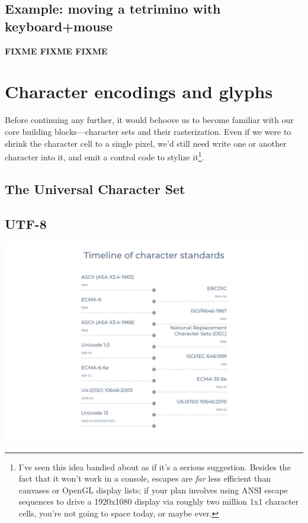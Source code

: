\documentclass[letterpaper,10pt]{article}
\begin{document}
\subsection{Example: moving a tetrimino with keyboard+mouse}
\textbf{FIXME FIXME FIXME}

\newpage


\section{Character encodings and glyphs}
\label{section:unicode}
Before continuing any further, it would behoove us to become familiar with our
core building blocks---character sets and their rasterization. Even if we were
to shrink the character cell to a single pixel, we'd still need write one or
another character into it, and emit a control code to stylize it\footnote{I've
seen this idea bandied about as if it's a serious suggestion. Besides the fact
that it won't work in a console, escapes are \textit{far} less efficient than
canvases or OpenGL display lists; if your plan involves using ANSI escape
sequences to drive a 1920x1080 display via roughly two million 1x1 character
cells, you're not going to space today, or maybe ever\cite{upgoerfive}.}.
\subsection{The Universal Character Set}
\subsection{UTF-8}

\begin{center}
\includegraphics[width=.9\linewidth]{media/charset-timeline.png}
\end{center}
\end{document}
